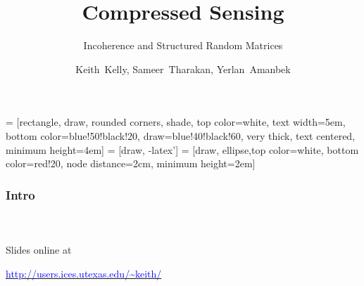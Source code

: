 \documentclass[mathserif,18pt,xcolor=table]{beamer}
\title{Compressed Sensing}
\subtitle{Incoherence and Structured Random Matrices}
\author[Keith Kelly, Sameer~Tharakan, Yerlan~Amanbek]{ {Keith~Kelly, Sameer~Tharakan, Yerlan~Amanbek} \\  
}
\institute{Institute for Computational Engineering \& Sciences\\ \mbox{}  \\  \pgfuseimage{utbig} }
\date[ACHA]
\begin{document}
 = [rectangle, draw, rounded corners, shade, top color=white, text width=5em,
  bottom color=blue!50!black!20, draw=blue!40!black!60, very thick, text centered, minimum height=4em]
   = [draw, -latex']
   = [draw, ellipse,top color=white, bottom color=red!20, node distance=2cm, minimum height=2em]


  \beamertemplateballitem

  \frame{\titlepage}



\begin{frame}[t]
\frametitle{Intro}
\framesubtitle{~~}  %

Slides online at

\href{http://users.ices.utexas.edu/~keith/}{\textcolor{blue}{http://users.ices.utexas.edu/\textasciitilde keith/}}


\end{frame}










\end{document}
